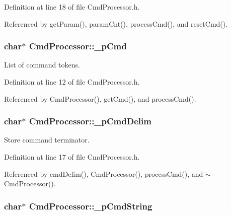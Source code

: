 Definition at line 18 of file CmdProcessor.h.



Referenced by getParam(), paramCnt(), processCmd(), and resetCmd().

\hypertarget{class_cmd_processor_a2017c885b275984549385ba246ec37f5}{
\subsubsection[{\_\-pCmd}]{\setlength{\rightskip}{0pt plus 5cm}char$\ast$ {\bf CmdProcessor::\_\-pCmd}}}
\label{class_cmd_processor_a2017c885b275984549385ba246ec37f5}


List of command tokens. 



Definition at line 12 of file CmdProcessor.h.



Referenced by CmdProcessor(), getCmd(), and processCmd().

\hypertarget{class_cmd_processor_a0f926649b612897af1cbee71d6a1a90a}{
\subsubsection[{\_\-pCmdDelim}]{\setlength{\rightskip}{0pt plus 5cm}char$\ast$ {\bf CmdProcessor::\_\-pCmdDelim}}}
\label{class_cmd_processor_a0f926649b612897af1cbee71d6a1a90a}


Store command terminator. 



Definition at line 17 of file CmdProcessor.h.



Referenced by cmdDelim(), CmdProcessor(), processCmd(), and $\sim$CmdProcessor().

\hypertarget{class_cmd_processor_acc77d1f9a20e535e1073950001c0cc36}{
\subsubsection[{\_\-pCmdString}]{\setlength{\rightskip}{0pt plus 5cm}char$\ast$ {\bf CmdProcessor::\_\-pCmdString}}}
\label{class_cmd_processor_acc77d1f9a20e535e1073950001c0cc36}


